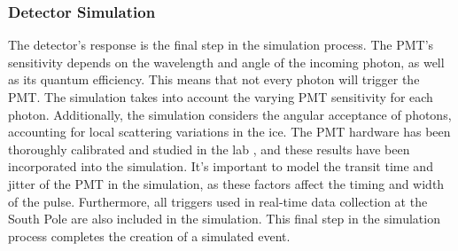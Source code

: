\subsubsection*{Detector Simulation}
The detector's response is the final step in the simulation process. The PMT's sensitivity depends on the wavelength and angle of the incoming photon, as well as its quantum efficiency. This means that not every photon will trigger the PMT. The simulation takes into account the varying PMT sensitivity for each photon. Additionally, the simulation considers the angular acceptance of photons, accounting for local scattering variations in the ice. The PMT hardware has been thoroughly calibrated and studied in the lab , and these results have been incorporated into the simulation. It's important to model the transit time and jitter of the PMT in the simulation, as these factors affect the timing and width of the pulse. Furthermore, all triggers used in real-time data collection at the South Pole are also included in the simulation. This final step in the simulation process completes the creation of a simulated event.


